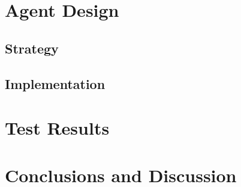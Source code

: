 \documentclass[a4,11pt]{scrartcl}
\begin{document}
\section{Agent Design}\label{agent}

\subsection{Strategy}

\subsection{Implementation}



\section{Test Results}



\section{Conclusions and Discussion}
\end{document}
